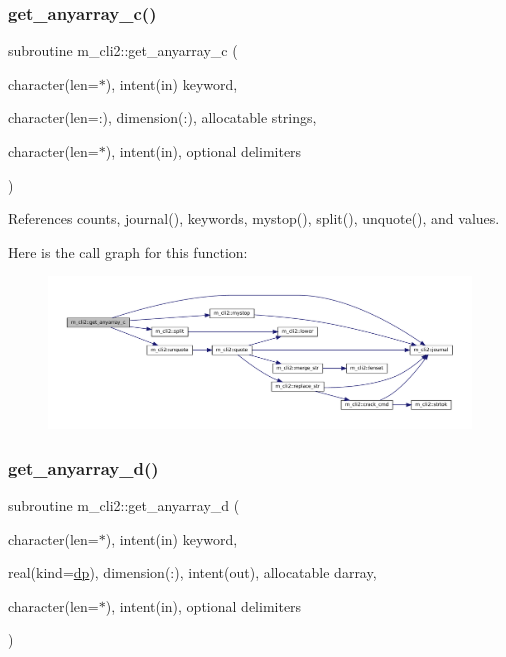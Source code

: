 \subsubsection{\texorpdfstring{get\+\_\+anyarray\+\_\+c()}{get\_anyarray\_c()}}
{\footnotesize\ttfamily subroutine m\+\_\+cli2\+::get\+\_\+anyarray\+\_\+c (\begin{DoxyParamCaption}\item[{character(len=$\ast$), intent(in)}]{keyword,  }\item[{character(len=\+:), dimension(\+:), allocatable}]{strings,  }\item[{character(len=$\ast$), intent(in), optional}]{delimiters }\end{DoxyParamCaption})\hspace{0.3cm}{\ttfamily [private]}}



References counts, journal(), keywords, mystop(), split(), unquote(), and values.

Here is the call graph for this function\+:
\nopagebreak
\begin{figure}[H]
\begin{center}
\leavevmode
\includegraphics[width=350pt]{namespacem__cli2_a448e8e24406f4bdbc14f26a940cbbc2c_cgraph}
\end{center}
\end{figure}
\mbox{\label{namespacem__cli2_aaede1f28172778cf45f4b6c04967bbbd}} 
\subsubsection{\texorpdfstring{get\+\_\+anyarray\+\_\+d()}{get\_anyarray\_d()}}
{\footnotesize\ttfamily subroutine m\+\_\+cli2\+::get\+\_\+anyarray\+\_\+d (\begin{DoxyParamCaption}\item[{character(len=$\ast$), intent(in)}]{keyword,  }\item[{real(kind=\mbox{\hyperlink{namespacem__cli2_acf83f1963cf6a56ad0221cfcf5402440}{dp}}), dimension(\+:), intent(out), allocatable}]{darray,  }\item[{character(len=$\ast$), intent(in), optional}]{delimiters }\end{DoxyParamCaption})\hspace{0.3cm}{\ttfamily [private]}}



